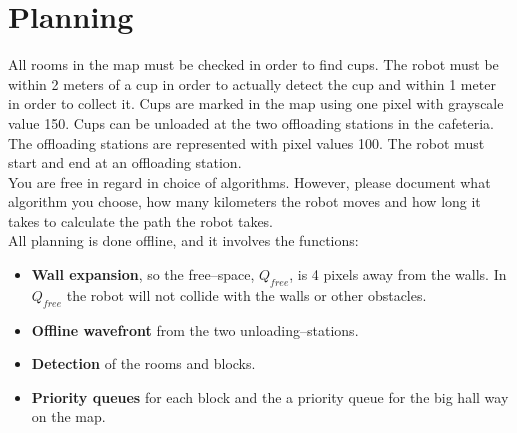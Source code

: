 \section{Planning}
\label{sec::planning}
All rooms in the map must be checked in order to find cups. The robot must be within 2 meters of a cup in order to actually detect the cup and within 1 meter in order to collect it. Cups are marked in the map using one pixel with grayscale value 150. Cups can be unloaded at the two offloading stations in the cafeteria. The offloading stations are represented with pixel values 100. The robot must start and end at an offloading station.\\[0.2cm]
You are free in regard in choice of algorithms. However, please document what algorithm you choose, how many kilometers the robot moves and how long it takes to calculate the path the robot takes.\\[0.2cm]
All planning is done offline, and it involves the functions:
\begin{itemize}\itemsep-2pt
\item \textbf{Wall expansion}, so the free--space, $Q_{free}$, is 4 pixels away from the walls. In $Q_{free}$ the robot will not collide with the walls or other obstacles.
\item \textbf{Offline wavefront} from the two unloading--stations.
\item \textbf{Detection} of the rooms and blocks.
\item \textbf{Priority queues} for each block and the a priority queue for the big hall way on the map.
\end{itemize}

